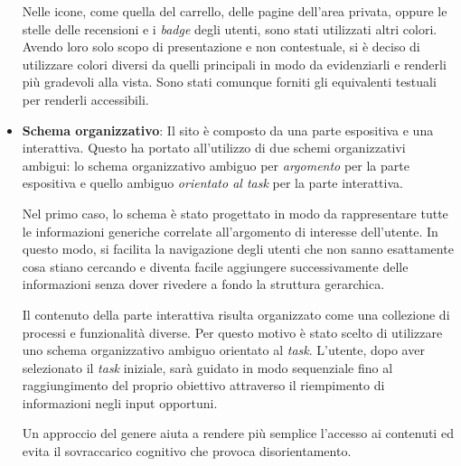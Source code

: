 \begin{itemize}
		Nelle icone, come quella del carrello, delle pagine dell'area privata, oppure le stelle delle recensioni e i \textit{badge} degli utenti, sono stati utilizzati altri colori. Avendo loro solo scopo di presentazione e non contestuale, si è deciso di utilizzare colori diversi da quelli principali in modo da evidenziarli e renderli più gradevoli alla vista. Sono stati comunque forniti gli equivalenti testuali per renderli accessibili.
		
	\item \textbf{Schema organizzativo}: Il sito è composto da una parte espositiva e una interattiva. Questo ha portato all'utilizzo di due schemi organizzativi ambigui: lo schema organizzativo ambiguo per \textit{argomento} per la parte espositiva e quello ambiguo \textit{orientato al task} per la parte interattiva.
	
		Nel primo caso, lo schema è stato progettato in modo da rappresentare tutte le informazioni generiche correlate all’argomento di interesse dell'utente. In questo modo, si facilita la navigazione degli utenti che non sanno esattamente cosa stiano cercando e diventa facile aggiungere successivamente delle informazioni senza dover rivedere a fondo la struttura gerarchica.
		
		Il contenuto della parte interattiva risulta organizzato come una collezione di processi e funzionalità diverse. Per questo motivo è stato scelto di utilizzare uno schema organizzativo ambiguo orientato al \textit{task}. L’utente, dopo aver selezionato il \textit{task} iniziale, sarà guidato in modo sequenziale fino al raggiungimento del proprio obiettivo attraverso il riempimento di informazioni negli input opportuni.
		
		Un approccio del genere aiuta a rendere più semplice l’accesso ai contenuti ed evita il sovraccarico cognitivo che provoca disorientamento.
\end{itemize}